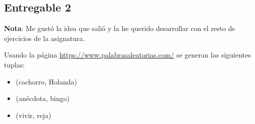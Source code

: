 


\subsection{Entregable 2}


\textbf{Nota}: Me gustó la idea que salió y la he querido desarrollar con el resto de ejercicios de la asignatura.

\vspace{\baselineskip}

Usando la página \url{https://www.palabrasaleatorias.com/} se generan las siguientes tuplas:
\begin{itemize}
    \item (cachorro, Holanda)
    \item (anécdota, bingo)
    \item (vivir, reja)
\end{itemize}

